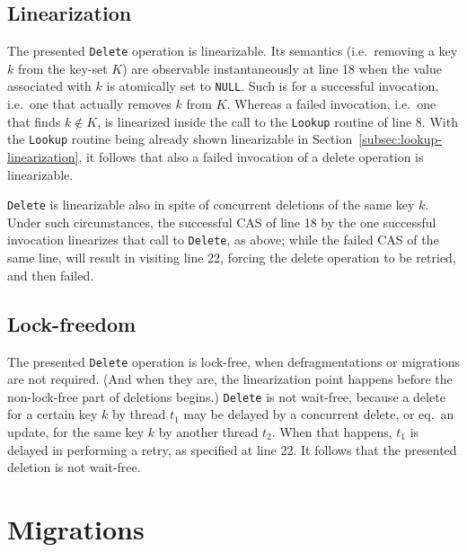 \subsection{Linearization}\label{subsec:delete-linearization}

The presented \texttt{Delete} operation is linearizable.
Its semantics (i.e.\ removing a key $k$ from the key-set $K$) are observable instantaneously at line 18 when the value associated with $k$ is atomically set to \texttt{NULL}.
Such is for a successful invocation, i.e.\ one that actually removes $k$ from $K$.
Whereas a failed invocation, i.e.\ one that finds $k \not\in K$, is linearized inside the call to the \texttt{Lookup} routine of line 8.
With the \texttt{Lookup} routine being already shown linearizable in Section~\ref{subsec:lookup-linearization}, it follows that also a failed invocation of a delete operation is linearizable.

\texttt{Delete} is linearizable also in spite of concurrent deletions of the same key $k$.
Under such circumstances, the successful CAS of line 18 by the one successful invocation linearizes that call to \texttt{Delete}, as above; while the failed CAS of the same line, will result in visiting line 22, forcing the delete operation to be retried, and then failed.

\subsection{Lock-freedom}\label{subsec:delete-lock-freedom}

The presented \texttt{Delete} operation is lock-free, when defragmentations or migrations are not required.
(And when they are, the linearization point happens before the non-lock-free part of deletions begins.)
\texttt{Delete} is not wait-free, because a delete for a certain key $k$ by thread $t_1$ may be delayed by a concurrent delete, or eq.\ an update, for the same key $k$ by another thread $t_2$.
When that happens, $t_1$ is delayed in performing a retry, as specified at line 22.
It follows that the presented deletion is not wait-free.




\section{Migrations}\label{sec:migrations}

